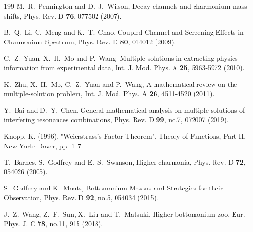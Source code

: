 \documentclass[prl,twocolumn,floatfix,amsmath,nofootinbib,amssymb,floatfix]{revtex4}
\begin{document}
\begin{thebibliography}{199}
M.~R.~Pennington and D.~J.~Wilson,
Decay channels and charmonium mass-shifts,
Phys. Rev. D \textbf{76}, 077502 (2007).


B.~Q.~Li, C.~Meng and K.~T.~Chao,
Coupled-Channel and Screening Effects in Charmonium Spectrum,
Phys. Rev. D \textbf{80}, 014012 (2009).


C.~Z.~Yuan, X.~H.~Mo and P.~Wang,
Multiple solutions in extracting physics information from experimental data,
Int. J. Mod. Phys. A \textbf{25}, 5963-5972 (2010).


K.~Zhu, X.~H.~Mo, C.~Z.~Yuan and P.~Wang,
A mathematical review on the multiple-solution problem,
Int. J. Mod. Phys. A \textbf{26}, 4511-4520 (2011).



Y.~Bai and D.~Y.~Chen,
General mathematical analysis on multiple solutions of interfering resonances combinations,
Phys. Rev. D \textbf{99}, no.7, 072007 (2019).


Knopp, K. (1996), "Weierstrass's Factor-Theorem", Theory of Functions, Part II, New York: Dover, pp. 1–7.


T.~Barnes, S.~Godfrey and E.~S.~Swanson,
Higher charmonia,
Phys. Rev. D \textbf{72}, 054026 (2005).


S.~Godfrey and K.~Moats,
Bottomonium Mesons and Strategies for their Observation,
Phys. Rev. D \textbf{92}, no.5, 054034 (2015).


J.~Z.~Wang, Z.~F.~Sun, X.~Liu and T.~Matsuki,
Higher bottomonium zoo,
Eur. Phys. J. C \textbf{78}, no.11, 915 (2018).



\end{thebibliography}
\end{document}
